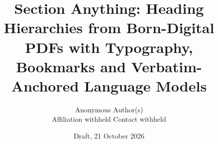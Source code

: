 %
%
%

\documentclass[11pt]{article}

\usepackage[utf8]{inputenc}
\usepackage[T1]{fontenc}
\usepackage{lmodern}
\usepackage[margin=1in]{geometry}
\usepackage{booktabs}
\usepackage{tabularx}
\usepackage{amsmath}
\usepackage{graphicx}
\usepackage{xcolor}
\usepackage{listings}
\usepackage{newunicodechar} %
\usepackage[hidelinks]{hyperref}

\newcommand{\todo}[1]{\textcolor{red}{\textbf{TODO:} #1}}
\newcommand{\sysname}{Section Anything}

\title{\sysname: Heading Hierarchies from Born-Digital PDFs with Typography, Bookmarks and
Verbatim-Anchored Language Models}
\author{Anonymous Author(s)\\ \small Affiliation withheld \quad Contact withheld}
\date{Draft, 21 October 2026}


\maketitle

